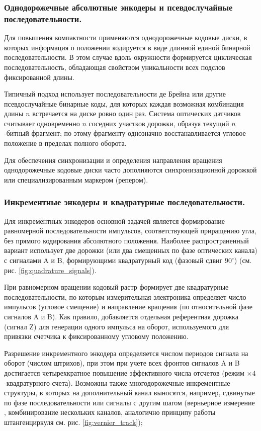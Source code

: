 \subsubsection{Однодорожечные абсолютные энкодеры и псевдослучайные последовательности.}
Для повышения компактности применяются однодорожечные кодовые диски, в которых информация о положении кодируется в виде длинной единой бинарной последовательности. В этом случае вдоль окружности формируется циклическая последовательность, обладающая свойством уникальности всех подслов фиксированной длины.

Типичный подход использует последовательности де Брейна или другие псевдослучайные бинарные коды, для которых каждая возможная комбинация длины $n$ встречается на диске ровно один раз. Система оптических датчиков считывает одновременно $n$ соседних участков дорожки, образуя текущий $n$-битный фрагмент; по этому фрагменту однозначно восстанавливается угловое положение в пределах полного оборота.

Для обеспечения синхронизации и определения направления вращения однодорожечные кодовые диски часто дополняются синхронизационной дорожкой или специализированным маркером (репером).

\subsubsection{Инкрементные энкодеры и квадратурные последовательности.}
Для инкрементных энкодеров основной задачей является формирование равномерной последовательности импульсов, соответствующей приращению угла, без прямого кодирования абсолютного положения. Наиболее распространенный вариант использует две дорожки (или два смещенных по фазе оптических канала) с сигналами A и B, формирующими квадратурный код (фазовый сдвиг $90^\circ$) (см. рис. \ref{fig:quadrature_signals}).

При равномерном вращении кодовый растр формирует две квадратурные последовательности, по которым измерительная электроника определяет число импульсов (угловое смещение) и направление вращения (по относительной фазе сигналов A и B). Как правило, добавляется отдельная референтная дорожка (сигнал Z) для генерации одного импульса на оборот, используемого для привязки счетчика к фиксированному угловому положению.

Разрешение инкрементного энкодера определяется числом периодов сигнала на оборот (числом штрихов), при этом при учете всех фронтов сигналов A и B достигается четырехкратное повышение эффективного числа отсчетов (режим $\times 4$-квадратурного счета). Возможны также многодорожечные инкрементные структуры, в которых на дополнительный канал выносятся, например, сдвинутые по фазе последовательности или сигналы с другим шагом (верньерное измерение \cite{bahn_vernier}, комбинирование нескольких каналов, аналогично принципу работы штангенциркуля см. рис. \ref{fig:vernier_track});

